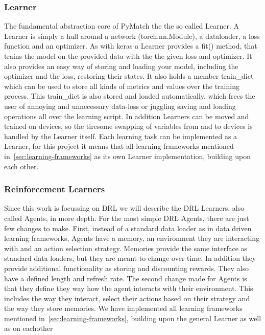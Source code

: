 \documentclass[11pt,a4paper]{article}
\begin{document}
	\subsubsection{Learner}
	The fundamental abstraction core of PyMatch the the so called Learner.
	A Learner is simply a hull around a network (torch.nn.Module), a dataloader, a loss function and an optimizer.
	As with keras a Learner provides a fit() method, that trains the model on the provided data with the the given loss and optimizer.
	It also provides an easy way of storing and loading your model, including the optimizer and the loss, restoring their states.
	It also holds a member train\_dict which can be used to store all kinds of metrics and values over the training process.
	This train\_dict is also stored and loaded automatically, which frees the user of annoying and unnecessary data-loss or juggling saving and loading operations all over the learning script.
	In addition Learners can be moved and trained on devices, so the tiresome swapping of variables from and to devices is handled by the Learner itself.
	Each learning task can be implemented as a Learner, for this project it means that all learning frameworks mentioned in~\ref{sec:learning-frameworks} as its own Learner implementation, building upon each other.

	\subsubsection{Reinforcement Learners}
	Since this work is focussing on DRL we will describe the DRL Learners, also called Agents, in more depth.
	For the most simple DRL Agents, there are just few changes to make.
	First, instead of a standard data loader as in data driven learning frameworks, Agents have a memory, an environment they are interacting with and an action selection strategy.
	Memories provide the same interface as standard data loaders, but they are meant to change over time.
	In addition they provide additional functionality as storing and discounting rewards.
	They also have a defined length and refresh rate.
	The second change made for Agents is that they define they way how the agent interacts with their environment.
	This includes the way they interact, select their actions based on their strategy and the way they store memories.
	We have implemented all learning frameworks mentioned in~\ref{sec:learning-frameworks}, building upon the general Learner as well as on eachother\\
	
\end{document}
